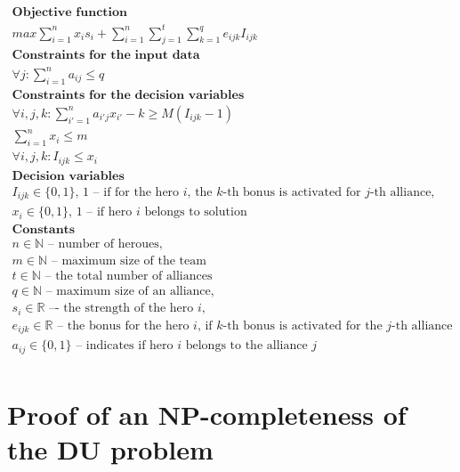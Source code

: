 \documentclass[smallextended]{svjour3}       %
\begin{document}
\begin{equation}
\label{eq:DUIP}
\begin{gathered}
\textbf{Objective function}\\
max \sum_{i=1}^{n} x_i s_i + \sum_{i=1}^{n} \sum_{j=1}^{t}  \sum_{k=1}^{q} e_{ijk} I_{ijk} \\
\textbf{Constraints for the input data}\\
\forall{j} : \sum_{i=1}^n a_{ij} \le q \\
\textbf{Constraints for the decision variables} \\
\forall{i,j,k} :  \sum_{i'=1}^{n} a_{i'j} x_{i'} - k \ge M( I_{ijk}  - 1) \\
\sum_{i=1}^n x_i \le m   \\ 
\forall{i,j,k} :  I_{ijk}  \le x_i \\
\textbf{Decision variables} \\
I_{ijk} \in \{0, 1\} \text {, 1 – if for the hero } i \text{, the } k\text{-th bonus is activated for }  j \text{-th alliance,} \\
x_i  \in \{0, 1\} \text{, 1 -- if hero } i \text{ belongs to solution} \\
\textbf{Constants} \\
n \in \mathbb{N} \text{ -- number of heroues,} \\
m \in \mathbb{N} \text{ -- maximum size of the team}\\
t \in \mathbb{N} \text{ -- the total number of alliances} \\
q \in \mathbb{N} \text{ -- maximum size of an alliance,} \\
s_i  \in \mathbb{R} \text{ –- the strength of the hero } i, \\
e_{ijk} \in \mathbb{R} \text{ -- the bonus for the hero } i \text{,  if } k
\text{-th bonus is activated for the } j \text{-th alliance} \\
a_{ij} \in \{0, 1\} \text{ -- indicates if hero } i \text{ belongs to the alliance } j \\ 
\end{gathered}
\end{equation}

\section{Proof of an NP-completeness of the DU problem}
\label{SectionNPCompleteProof}
\end{document}
